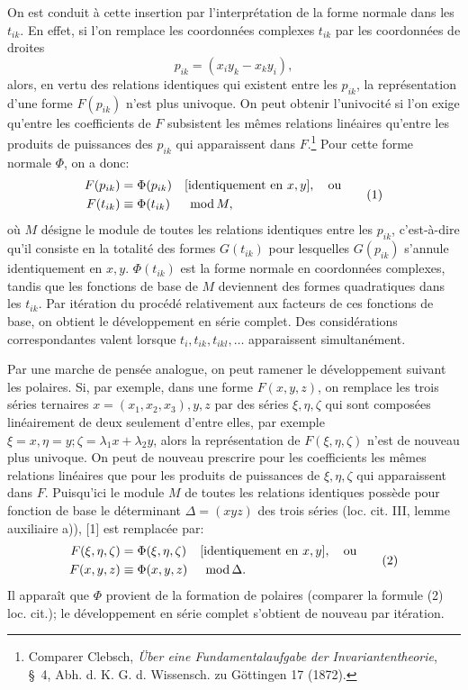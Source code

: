 On est conduit à cette insertion par l'interprétation de la forme normale dans les $t_{ik}$. En effet, si l'on remplace les \og{} coordonnées complexes \fg{} $t_{ik}$ par les \og{} coordonnées de droites \fg{}
\[
        p_{ik}=(x_i y_k-x_k y_i),
\]
alors, en vertu des relations identiques qui existent entre les $p_{ik}$, la représentation d'une forme $F(p_{ik})$ n'est plus univoque. On peut obtenir l'univocité si l'on exige qu'entre les coefficients de $F$ subsistent les mêmes relations linéaires qu'entre les produits de puissances des $p_{ik}$ qui apparaissent dans $F$.\footnote{Comparer Clebsch, \emph{Über eine Fundamentalaufgabe der Invariantentheorie}, \S~4, Abh. d. K. G. d. Wissensch. zu Göttingen 17 (1872).} Pour cette forme normale $\Phi$, on a donc:
\begin{equation}
\begin{aligned}
        F(p_{ik})&=\Phi(p_{ik}) &&[\text{identiquement en }x,y],\quad\text{ou}\notag\\
        F(t_{ik})&\equiv\Phi(t_{ik}) &&\;\operatorname{mod} M,
\end{aligned}
\tag{1}
\end{equation}
où $M$ désigne le module de toutes les relations identiques entre les $p_{ik}$, c'est-à-dire qu'il consiste en la totalité des formes $G(t_{ik})$ pour lesquelles $G(p_{ik})$ s'annule identiquement en $x,y$. $\Phi(t_{ik})$ est la \og{} forme normale \fg{} en coordonnées complexes, tandis que les fonctions de base de $M$ deviennent des formes quadratiques dans les $t_{ik}$. Par itération du procédé relativement aux facteurs de ces fonctions de base, on obtient le développement en série complet. Des considérations correspondantes valent lorsque $t_i,t_{ik},t_{ikl},\ldots$ apparaissent simultanément.

Par une marche de pensée analogue, on peut ramener le développement suivant les polaires. Si, par exemple, dans une forme $F(x,y,z)$, on remplace les trois séries ternaires $x=(x_1,x_2,x_3),y,z$ par des séries $\xi,\eta,\zeta$ qui sont composées linéairement de deux seulement d'entre elles, par exemple $\xi=x,\eta=y;\zeta=\lambda_1x+\lambda_2y$, alors la représentation de $F(\xi,\eta,\zeta)$ n'est de nouveau plus univoque. On peut de nouveau prescrire pour les coefficients les mêmes relations linéaires que pour les produits de puissances de $\xi,\eta,\zeta$ qui apparaissent dans $F$. Puisqu'ici le module $M$ de toutes les relations identiques possède pour fonction de base le déterminant $\Delta=(xyz)$ des trois séries (loc. cit. III, lemme auxiliaire a)), [1] est remplacée par:
\begin{equation}
\begin{aligned}
        F(\xi,\eta,\zeta)&=\Phi(\xi,\eta,\zeta)&&[\text{identiquement en }x,y],\quad\text{ou}\notag\\
        F(x,y,z)&\equiv\Phi(x,y,z)&&\;\operatorname{mod} \Delta.
\end{aligned}
\tag{2}
\end{equation}
Il apparaît que $\Phi$ provient de la formation de polaires (comparer la formule (2) loc. cit.); le développement en série complet s'obtient de nouveau par itération.

